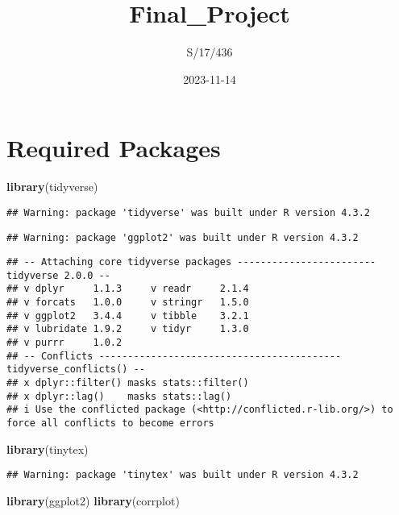 \documentclass[
]{article}
\title{Final\_Project}
\author{S/17/436}
\date{2023-11-14}
\newenvironment{Shaded}{\begin{snugshade}}{\end{snugshade}}
\newcommand{\FunctionTok}[1]{\textcolor[rgb]{0.13,0.29,0.53}{\textbf{#1}}}
\newcommand{\NormalTok}[1]{#1}
\begin{document}
\maketitle

\hypertarget{required-packages}{%
\section{Required Packages}\label{required-packages}}

\begin{Shaded}
\begin{Highlighting}[]
\FunctionTok{library}\NormalTok{(tidyverse)}
\end{Highlighting}
\end{Shaded}

\begin{verbatim}
## Warning: package 'tidyverse' was built under R version 4.3.2
\end{verbatim}

\begin{verbatim}
## Warning: package 'ggplot2' was built under R version 4.3.2
\end{verbatim}

\begin{verbatim}
## -- Attaching core tidyverse packages ------------------------ tidyverse 2.0.0 --
## v dplyr     1.1.3     v readr     2.1.4
## v forcats   1.0.0     v stringr   1.5.0
## v ggplot2   3.4.4     v tibble    3.2.1
## v lubridate 1.9.2     v tidyr     1.3.0
## v purrr     1.0.2     
## -- Conflicts ------------------------------------------ tidyverse_conflicts() --
## x dplyr::filter() masks stats::filter()
## x dplyr::lag()    masks stats::lag()
## i Use the conflicted package (<http://conflicted.r-lib.org/>) to force all conflicts to become errors
\end{verbatim}

\begin{Shaded}
\begin{Highlighting}[]
\FunctionTok{library}\NormalTok{(tinytex)}
\end{Highlighting}
\end{Shaded}

\begin{verbatim}
## Warning: package 'tinytex' was built under R version 4.3.2
\end{verbatim}

\begin{Shaded}
\begin{Highlighting}[]
\FunctionTok{library}\NormalTok{(ggplot2)}
\FunctionTok{library}\NormalTok{(corrplot)}
\end{Highlighting}
\end{Shaded}
\end{document}
